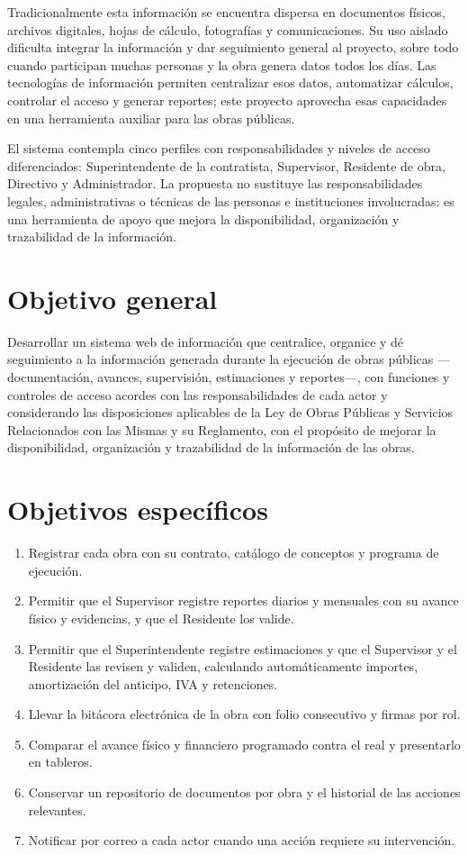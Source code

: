 Tradicionalmente esta información se encuentra dispersa en documentos físicos, archivos digitales, hojas de cálculo, fotografías y comunicaciones. Su uso aislado dificulta integrar la información y dar seguimiento general al proyecto, sobre todo cuando participan muchas personas y la obra genera datos todos los días. Las tecnologías de información permiten centralizar esos datos, automatizar cálculos, controlar el acceso y generar reportes; este proyecto aprovecha esas capacidades en una herramienta auxiliar para las obras públicas.

El sistema contempla cinco perfiles con responsabilidades y niveles de acceso diferenciados: Superintendente de la contratista, Supervisor, Residente de obra, Directivo y Administrador. La propuesta no sustituye las responsabilidades legales, administrativas o técnicas de las personas e instituciones involucradas: es una herramienta de apoyo que mejora la disponibilidad, organización y trazabilidad de la información.

\section{Objetivo general}
Desarrollar un sistema web de información que centralice, organice y dé seguimiento a la información generada durante la ejecución de obras públicas ---documentación, avances, supervisión, estimaciones y reportes---, con funciones y controles de acceso acordes con las responsabilidades de cada actor y considerando las disposiciones aplicables de la Ley de Obras Públicas y Servicios Relacionados con las Mismas y su Reglamento, con el propósito de mejorar la disponibilidad, organización y trazabilidad de la información de las obras.

\section{Objetivos específicos}
\begin{enumerate}
  \item Registrar cada obra con su contrato, catálogo de conceptos y programa de ejecución.
  \item Permitir que el Supervisor registre reportes diarios y mensuales con su avance físico y evidencias, y que el Residente los valide.
  \item Permitir que el Superintendente registre estimaciones y que el Supervisor y el Residente las revisen y validen, calculando automáticamente importes, amortización del anticipo, IVA y retenciones.
  \item Llevar la bitácora electrónica de la obra con folio consecutivo y firmas por rol.
  \item Comparar el avance físico y financiero programado contra el real y presentarlo en tableros.
  \item Conservar un repositorio de documentos por obra y el historial de las acciones relevantes.
  \item Notificar por correo a cada actor cuando una acción requiere su intervención.
\end{enumerate}


